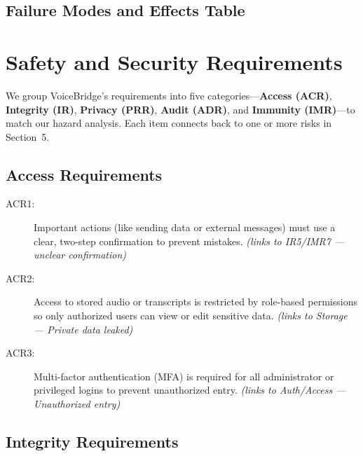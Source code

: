 \documentclass{article}
\begin{document}
\subsection{Failure Modes and Effects Table}

\section{Safety and Security Requirements}

We group VoiceBridge’s requirements into five categories—\textbf{Access (ACR)}, \textbf{Integrity (IR)}, \textbf{Privacy (PRR)}, \textbf{Audit (ADR)}, and \textbf{Immunity (IMR)}—to match our hazard analysis. Each item connects back to one or more risks in Section~5.

\subsection{Access Requirements}

\begin{description}
  \item[ACR1:] Important actions (like sending data or external messages) must use a clear, two-step confirmation to prevent mistakes. \emph{(links to IR5/IMR7 — unclear confirmation)}
  \item[ACR2:] Access to stored audio or transcripts is restricted by role-based permissions so only authorized users can view or edit sensitive data. \emph{(links to Storage — Private data leaked)}
  \item[ACR3:] Multi-factor authentication (MFA) is required for all administrator or privileged logins to prevent unauthorized entry. \emph{(links to Auth/Access — Unauthorized entry)}
\end{description}

\subsection{Integrity Requirements}
\end{document}
